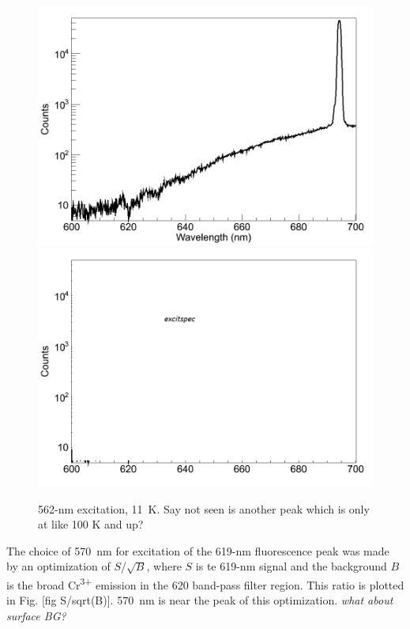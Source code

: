 \begin{figure} %
        \centering
                \includegraphics[width=.7\textwidth]{figures/Cr_a.png}
                \includegraphics[width=.7\textwidth]{figures/Cr_b.png}
                \caption{562-nm excitation, 11~K.  Say not seen is another peak which is only at like 100 K and up?}
\label{fig:Cr}
\end{figure}


The choice of 570~nm for excitation of the 619-nm fluorescence peak was made by an optimization of $S$/$\sqrt{B}$, where $S$ is te 619-nm signal and the background $B$ is the broad Cr\textsuperscript{3+} emission in the 620 band-pass filter region.  This ratio is plotted in Fig. [fig S/sqrt(B)].  570~nm is near the peak of this optimization.  \emph{\color{gray}what about surface BG?}

